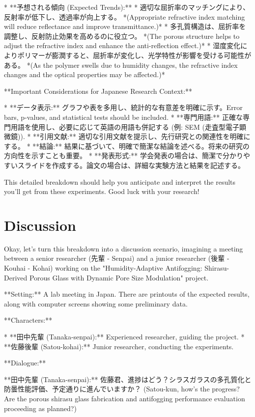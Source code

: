 \documentclass{article}
\begin{document}
*   **予想される傾向 (Expected Trends):**
    *   適切な屈折率のマッチングにより、反射率が低下し、透過率が向上する。
        *(Appropriate refractive index matching will reduce reflectance and improve transmittance.)*
    *   多孔質構造は、屈折率を調整し、反射防止効果を高めるのに役立つ。
        *(The porous structure helps to adjust the refractive index and enhance the anti-reflection effect.)*
    *   湿度変化によりポリマーが膨潤すると、屈折率が変化し、光学特性が影響を受ける可能性がある。
        *(As the polymer swells due to humidity changes, the refractive index changes and the optical properties may be affected.)*

**Important Considerations for Japanese Research Context:**

*   **データ表示:** グラフや表を多用し、統計的な有意差を明確に示す。Error bars, p-values, and statistical tests should be included.
*   **専門用語:**  正確な専門用語を使用し、必要に応じて英語の用語も併記する (例: SEM (走査型電子顕微鏡)).
*   **引用文献:** 適切な引用文献を提示し、先行研究との関連性を明確にする。
*   **結論:** 結果に基づいて、明確で簡潔な結論を述べる。将来の研究の方向性を示すことも重要。
*   **発表形式:** 学会発表の場合は、簡潔で分かりやすいスライドを作成する。論文の場合は、詳細な実験方法と結果を記述する。

This detailed breakdown should help you anticipate and interpret the results you'll get from these experiments. Good luck with your research!


\section{Discussion}
Okay, let's turn this breakdown into a discussion scenario, imagining a meeting between a senior researcher (先輩 - Senpai) and a junior researcher (後輩 - Kouhai - Kohai) working on the "Humidity-Adaptive Antifogging: Shirasu-Derived Porous Glass with Dynamic Pore Size Modulation" project.

**Setting:** A lab meeting in Japan. There are printouts of the expected results, along with computer screens showing some preliminary data.

**Characters:**

*   **田中先輩 (Tanaka-senpai):** Experienced researcher, guiding the project.
*   **佐藤後輩 (Satou-kohai):** Junior researcher, conducting the experiments.

**Dialogue:**

**田中先輩 (Tanaka-senpai):**  佐藤君、進捗はどう？シラスガラスの多孔質化と防曇性能評価、予定通りに進んでいますか？ (Satou-kun, how's the progress? Are the porous shirasu glass fabrication and antifogging performance evaluation proceeding as planned?)
\end{document}
